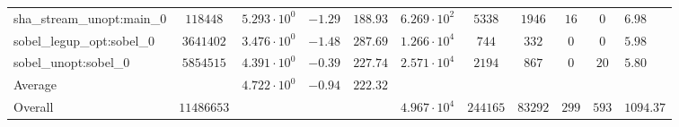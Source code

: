 \begin{tabular}{|l|c|HHc|c|c|c|c|cH|}
sha\_stream\_unopt:main\_0                      & $ 118448   $ & $ 5.293 \cdot 10^{0} $ & $ -1.29 $ & $ 188.93 $ & $ 6.269 \cdot 10^{2}  $ & $ 5338   $ & $ 1946  $ & $ 16  $ & $ 0   $ & $ 6.98    $ \\
sobel\_legup\_opt:sobel\_0                      & $ 3641402  $ & $ 3.476 \cdot 10^{0} $ & $ -1.48 $ & $ 287.69 $ & $ 1.266 \cdot 10^{4}  $ & $ 744    $ & $ 332   $ & $ 0   $ & $ 0   $ & $ 5.98    $ \\
sobel\_unopt:sobel\_0                           & $ 5854515  $ & $ 4.391 \cdot 10^{0} $ & $ -0.39 $ & $ 227.74 $ & $ 2.571 \cdot 10^{4}  $ & $ 2194   $ & $ 867   $ & $ 0   $ & $ 20  $ & $ 5.80    $ \\
\hline
Average                                         & $          $ & $ 4.722 \cdot 10^{0} $ & $ -0.94 $ & $ 222.32 $ & $                     $ & $        $ & $       $ & $     $ & $     $ & $         $ \\
\hline
Overall                                         & $ 11486653 $ & $                    $ & $       $ & $        $ & $ 4.967 \cdot 10^{4}  $ & $ 244165 $ & $ 83292 $ & $ 299 $ & $ 593 $ & $ 1094.37 $ \\
\hline
\end{tabular}
